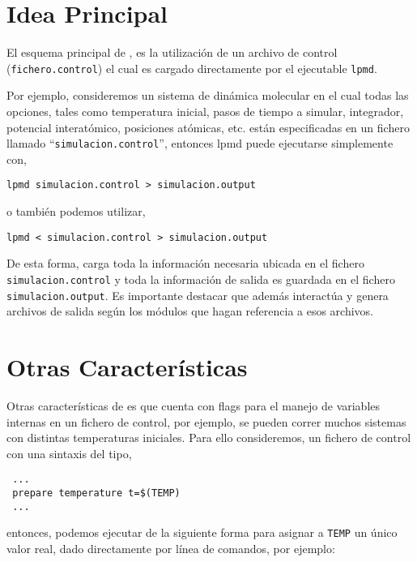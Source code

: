 \section{Idea Principal}

El esquema principal de \lpmd, es la utilizaci\'on de un archivo de control (\verb|fichero.control|) el cual es cargado directamente por el ejecutable \verb|lpmd|.

Por ejemplo, consideremos un sistema de din\'amica molecular en el cual todas las opciones, tales como temperatura inicial, pasos de tiempo a simular, integrador, potencial interat\'omico, posiciones at\'omicas, etc. est\'an especificadas en un fichero llamado ``\verb|simulacion.control|'', entonces lpmd puede ejecutarse simplemente con,

\begin{center}
 \texttt{lpmd simulacion.control > simulacion.output}
\end{center}

o tambi\'en podemos utilizar,

\begin{center}
 \texttt{lpmd < simulacion.control > simulacion.output}
\end{center}

De esta forma, \lpmd carga toda la informaci\'on necesaria ubicada en el fichero \verb|simulacion.control| y toda la informaci\'on de salida es guardada en el fichero \verb|simulacion.output|. Es importante destacar que \lpmd adem\'as interact\'ua y genera archivos de salida seg\'un los m\'odulos que hagan referencia a esos archivos.

\section{Otras Caracter\'isticas}

Otras caracter\'isticas de \lpmd es que cuenta con flags para el manejo de variables internas en un fichero de control, por ejemplo, se pueden correr muchos sistemas con distintas temperaturas iniciales. Para ello consideremos, un fichero de control con una sintaxis del tipo,

\begin{verbatim}
 ...
 prepare temperature t=$(TEMP)
 ...
\end{verbatim}

entonces, podemos ejecutar \lpmd de la siguiente forma para asignar a \verb|TEMP| un \'unico valor real, dado directamente por l\'inea de comandos, por ejemplo:

